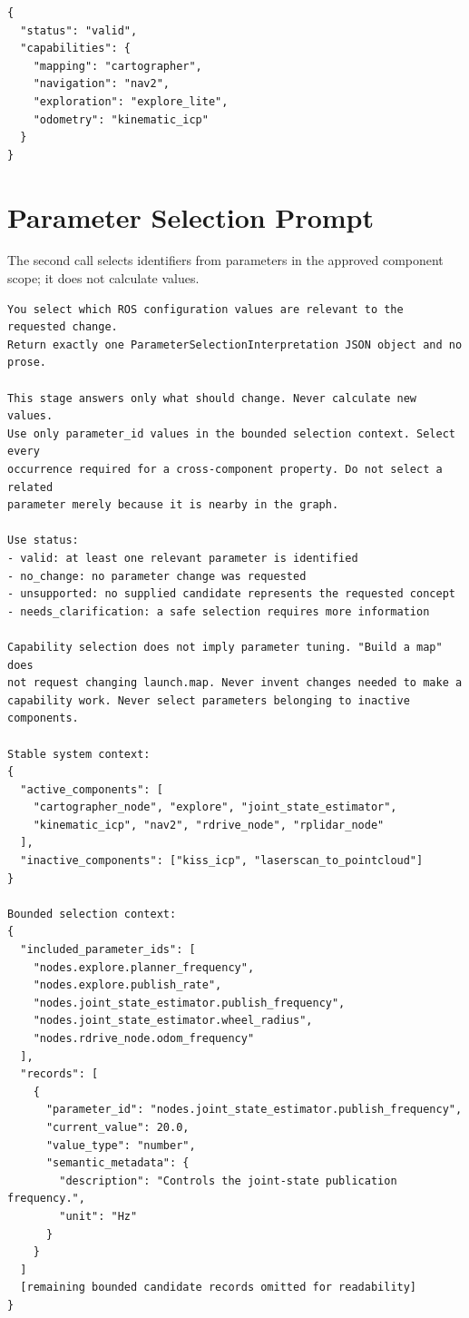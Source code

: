 \begin{lstlisting}[style=annexcode,language={},caption={Capability interpretation returned by the model.},label={lst:capability-response}]
{
  "status": "valid",
  "capabilities": {
    "mapping": "cartographer",
    "navigation": "nav2",
    "exploration": "explore_lite",
    "odometry": "kinematic_icp"
  }
}
\end{lstlisting}

\section{Parameter Selection Prompt}

The second call selects identifiers from parameters in the approved component scope; it does not calculate values.

\begin{lstlisting}[style=annexcode,caption={Representative parameter-selection system message.},label={lst:selection-system-prompt}]
You select which ROS configuration values are relevant to the requested change.
Return exactly one ParameterSelectionInterpretation JSON object and no prose.

This stage answers only what should change. Never calculate new values.
Use only parameter_id values in the bounded selection context. Select every
occurrence required for a cross-component property. Do not select a related
parameter merely because it is nearby in the graph.

Use status:
- valid: at least one relevant parameter is identified
- no_change: no parameter change was requested
- unsupported: no supplied candidate represents the requested concept
- needs_clarification: a safe selection requires more information

Capability selection does not imply parameter tuning. "Build a map" does
not request changing launch.map. Never invent changes needed to make a
capability work. Never select parameters belonging to inactive components.

Stable system context:
{
  "active_components": [
    "cartographer_node", "explore", "joint_state_estimator",
    "kinematic_icp", "nav2", "rdrive_node", "rplidar_node"
  ],
  "inactive_components": ["kiss_icp", "laserscan_to_pointcloud"]
}

Bounded selection context:
{
  "included_parameter_ids": [
    "nodes.explore.planner_frequency",
    "nodes.explore.publish_rate",
    "nodes.joint_state_estimator.publish_frequency",
    "nodes.joint_state_estimator.wheel_radius",
    "nodes.rdrive_node.odom_frequency"
  ],
  "records": [
    {
      "parameter_id": "nodes.joint_state_estimator.publish_frequency",
      "current_value": 20.0,
      "value_type": "number",
      "semantic_metadata": {
        "description": "Controls the joint-state publication frequency.",
        "unit": "Hz"
      }
    }
  ]
  [remaining bounded candidate records omitted for readability]
}
\end{lstlisting}

